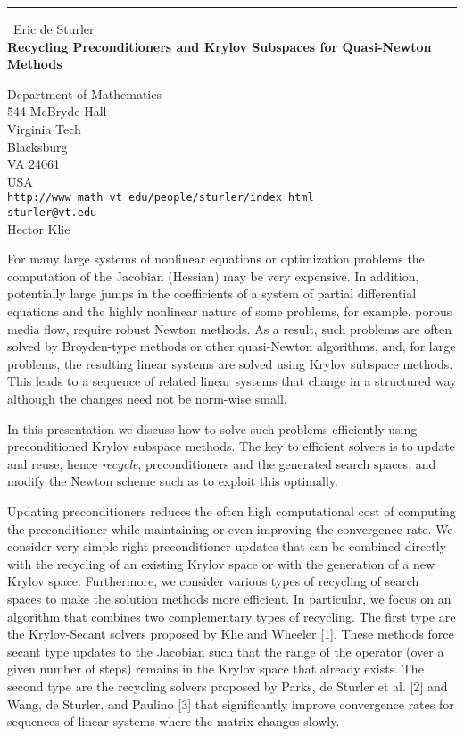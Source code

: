 \documentclass{report}
\begin{document}
\begin{center}
\rule{6in}{1pt} \
{\large Eric de Sturler \\
{\bf Recycling Preconditioners and Krylov Subspaces for Quasi-Newton Methods}}

Department of Mathematics \\ 544 McBryde Hall \\ Virginia Tech \\ Blacksburg \\ VA 24061 \\ USA \\ {\tt http://www math vt edu/people/sturler/index html}
\\
{\tt sturler@vt.edu}\\
Hector Klie\end{center}

For many large systems of nonlinear equations or optimization problems
the computation of the Jacobian (Hessian) may be very expensive. In
addition, potentially large jumps in the coefficients of a system of
partial differential equations and the highly nonlinear nature of some
problems, for example, porous media flow, require robust Newton methods.
As a result, such problems are often solved by Broyden-type methods or
other quasi-Newton algorithms, and, for large problems, the resulting
linear systems are solved using Krylov subspace methods. This leads to a
sequence of related linear systems that change in a structured way
although the changes need not be norm-wise small.

In this presentation we discuss how to solve such problems efficiently
using preconditioned Krylov subspace methods. The key to efficient
solvers is to update and reuse, hence {\em recycle}, preconditioners and
the generated search spaces, and modify the Newton scheme such as to
exploit this optimally.

Updating preconditioners reduces the often high computational cost of
computing the preconditioner while maintaining or even improving the
convergence rate.
We consider very simple right preconditioner updates that can be combined
directly with the recycling of an existing Krylov space or with the
generation of a new Krylov space. Furthermore, we consider various types
of recycling of search spaces to make the solution methods more
efficient. In particular, we focus on an algorithm that combines two
complementary types of recycling. The first type are the Krylov-Secant
solvers proposed by Klie and Wheeler [1]. These methods force secant type
updates to the
Jacobian such that the range of the operator (over a given number of
steps) remains in the Krylov space that already exists. The second type
are the recycling solvers proposed by Parks, de Sturler et al. [2] and
Wang, de Sturler, and Paulino [3] that significantly improve convergence
rates for sequences of linear systems where the matrix changes slowly.
\end{document}
